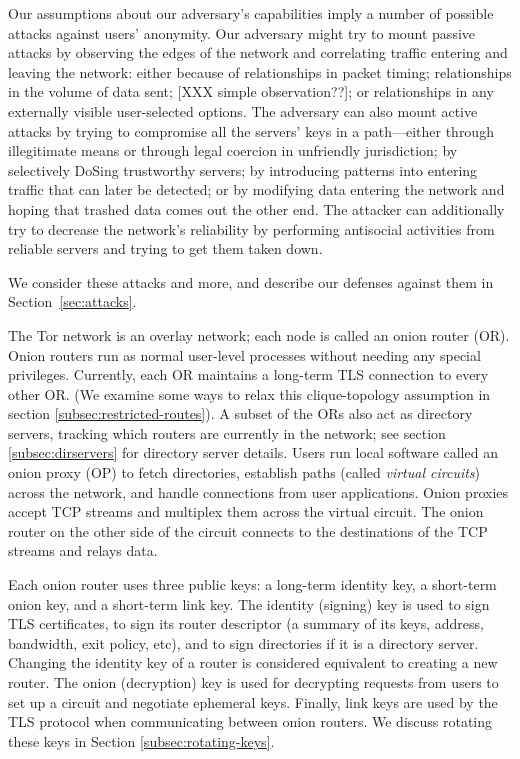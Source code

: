 \documentclass[times,10pt,twocolumn]{article}
\begin{document}
Our assumptions about our adversary's capabilities imply a number of
possible attacks against users' anonymity.  Our adversary might try to
mount passive attacks by observing the edges of the network and
correlating traffic entering and leaving the network: either because
of relationships in packet timing; relationships in the volume of data
sent; [XXX simple observation??]; or relationships in any externally
visible user-selected options.  The adversary can also mount active
attacks by trying to compromise all the servers' keys in a
path---either through illegitimate means or through legal coercion in
unfriendly jurisdiction; by selectively DoSing trustworthy servers; by
introducing patterns into entering traffic that can later be detected;
or by modifying data entering the network and hoping that trashed data
comes out the other end.  The attacker can additionally try to
decrease the network's reliability by performing antisocial activities
from reliable servers and trying to get them taken down.

We consider these attacks and more, and describe our defenses against them
in Section~\ref{sec:attacks}.



\label{sec:design}

The Tor network is an overlay network; each node is called an onion router
(OR). Onion routers run as normal user-level processes without needing
any special
privileges.  Currently, each OR maintains a long-term TLS connection
to every other
OR.  (We examine some ways to relax this clique-topology assumption in
section \ref{subsec:restricted-routes}). A subset of the ORs also act as
directory servers, tracking which routers are currently in the network;
see section \ref{subsec:dirservers} for directory server details. Users
run local software called an onion proxy (OP) to fetch directories,
establish paths (called \emph{virtual circuits}) across the network,
and handle connections from user applications. Onion proxies accept
TCP streams and multiplex them across the virtual circuit. The onion
router on the other side 
of the circuit connects to the destinations of
the TCP streams and relays data.

Each onion router uses three public keys: a long-term identity key, a
short-term onion key, and a short-term link key.  The identity
(signing) key is used to sign TLS certificates, to sign its router
descriptor (a summary of its keys, address, bandwidth, exit policy,
etc), and to sign directories if it is a directory server. Changing
the identity key of a router is considered equivalent to creating a
new router. The onion (decryption) key is used for decrypting requests
from users to set up a circuit and negotiate ephemeral keys. Finally,
link keys are used by the TLS protocol when communicating between
onion routers.  We discuss rotating these keys in Section
\ref{subsec:rotating-keys}.
\end{document}
